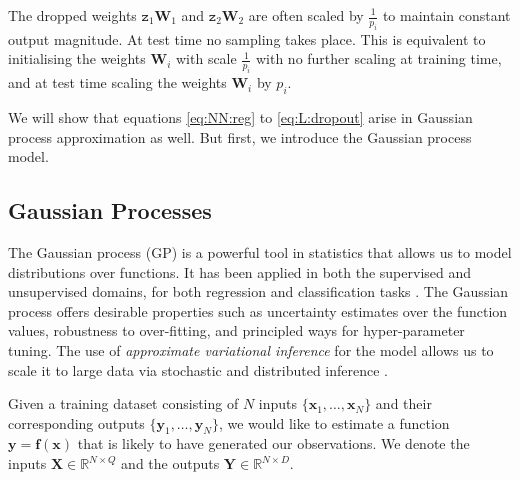 \documentclass{article} %
\def\red#1{\textcolor{red}{#1}}
\newcommand{\R}{\mathbb{R}}
\newcommand{\cL}{\mathcal{L}}
\newcommand{\f}{\mathbf{f}}
\newcommand{\x}{\mathbf{x}}
\newcommand{\Bb}{\mathbf{b}}
\newcommand{\sBb}{\mathtt{z}}
\newcommand{\y}{\mathbf{y}}
\newcommand{\W}{\mathbf{W}}
\newcommand{\X}{\mathbf{X}}
\newcommand{\Y}{\mathbf{Y}}
\newcommand{\reg}{\eta}
\newcommand{\weightdecay}{\lambda}
\theoremstyle{definition}
\begin{document}

The dropped weights $\sBb_1\W_1$ and $\sBb_2\W_2$ are often scaled by $\frac{1}{p_i}$ to maintain constant output magnitude. At test time no sampling takes place. This is equivalent to initialising the weights $\W_i$ with scale $\frac{1}{p_i}$ with no further scaling at training time, and at test time scaling the weights $\W_i$ by $p_i$. %

We will show that equations \eqref{eq:NN:reg} to \eqref{eq:L:dropout} arise in Gaussian process approximation as well. But first, we introduce the Gaussian process model.

\subsection{Gaussian Processes}

The Gaussian process (GP) is a powerful tool in statistics that allows us to model distributions over functions. It has been applied in both the supervised and unsupervised domains, for both regression and classification tasks \citep{Rasmussen2005Gaussian,titsias2010bayesian,Gal2015Latent}. The Gaussian process offers desirable properties such as uncertainty estimates over the function values, robustness to over-fitting, and principled ways for hyper-parameter tuning. The use of \textit{approximate variational inference} for the model allows us to scale it to large data via stochastic and distributed inference \citep{hensman2013Gaussian,Gal2014DistributedB}.

Given a training dataset consisting of $N$ inputs $\{ \x_1, \hdots, \x_N \}$ and their corresponding outputs $\{\y_1, \hdots, \y_N\}$, we would like to estimate a function $\y = \f(\mathbf{x})$ that is likely to have generated our observations. We denote the inputs $\X \in \R^{N \times Q}$ and the outputs $\Y \in \R^{N \times D}$. 
 
\end{document}
